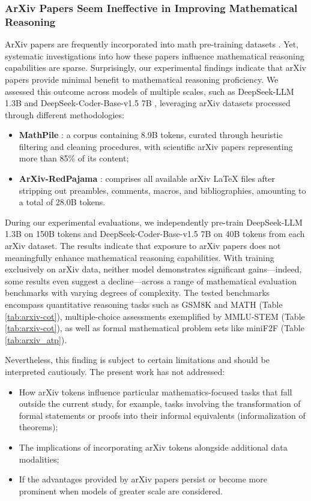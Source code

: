 \begin{itemize}[topsep=0pt]
\subsubsection{ArXiv Papers Seem Ineffective in Improving Mathematical Reasoning}

ArXiv papers are frequently incorporated into math pre-training datasets \citep{minerva,gpt-f,llemma,mathpile}. Yet, systematic investigations into how these papers influence mathematical reasoning capabilities are sparse. Surprisingly, our experimental findings indicate that arXiv papers provide minimal benefit to mathematical reasoning proficiency. We assessed this outcome across models of multiple scales, such as DeepSeek-LLM 1.3B and DeepSeek-Coder-Base-v1.5 7B \citep{deepseek-coder}, leveraging arXiv datasets processed through different methodologies:

\begin{itemize}[topsep=0pt]
    \item \textbf{MathPile} \citep{mathpile}: a corpus containing 8.9B tokens, curated through heuristic filtering and cleaning procedures, with scientific arXiv papers representing more than 85\% of its content;
    \item \textbf{ArXiv-RedPajama} \citep{redpajama}: comprises all available arXiv LaTeX files after stripping out preambles, comments, macros, and bibliographies, amounting to a total of 28.0B tokens.
\end{itemize}

During our experimental evaluations, we independently pre-train DeepSeek-LLM 1.3B on 150B tokens and DeepSeek-Coder-Base-v1.5 7B on 40B tokens from each arXiv dataset. The results indicate that exposure to arXiv papers does not meaningfully enhance mathematical reasoning capabilities. With training exclusively on arXiv data, neither model demonstrates significant gains—indeed, some results even suggest a decline—across a range of mathematical evaluation benchmarks with varying degrees of complexity. The tested benchmarks encompass quantitative reasoning tasks such as GSM8K and MATH (Table \ref{tab:arxiv-cot}), multiple-choice assessments exemplified by MMLU-STEM (Table \ref{tab:arxiv-cot}), as well as formal mathematical problem sets like miniF2F (Table \ref{tab:arxiv_atp}).

Nevertheless, this finding is subject to certain limitations and should be interpreted cautiously. The present work has not addressed:

\begin{itemize}[topsep=0pt]
    \item How arXiv tokens influence particular mathematics-focused tasks that fall outside the current study, for example, tasks involving the transformation of formal statements or proofs into their informal equivalents (informalization of theorems);
    \item The implications of incorporating arXiv tokens alongside additional data modalities;
    \item If the advantages provided by arXiv papers persist or become more prominent when models of greater scale are considered.
\end{itemize}


\end{itemize}

